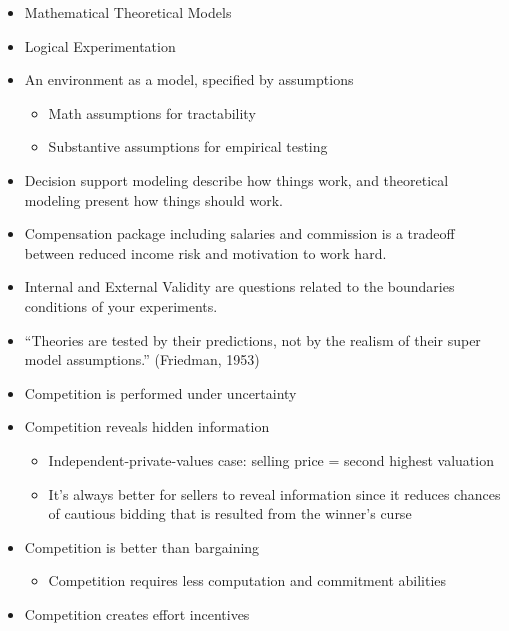 \documentclass[
]{book}
\providecommand{\tightlist}{%
  \setlength{\itemsep}{0pt}\setlength{\parskip}{0pt}}
\begin{document}
\citep{moorthy1993}

\begin{itemize}
\item
  Mathematical Theoretical Models
\item
  Logical Experimentation
\item
  An environment as a model, specified by assumptions

  \begin{itemize}
  \item
    Math assumptions for tractability
  \item
    Substantive assumptions for empirical testing
  \end{itemize}
\item
  Decision support modeling describe how things work, and theoretical modeling present how things should work.
\item
  Compensation package including salaries and commission is a tradeoff between reduced income risk and motivation to work hard.
\item
  Internal and External Validity are questions related to the boundaries conditions of your experiments.
\item
  ``Theories are tested by their predictions, not by the realism of their super model assumptions.'' (Friedman, 1953)
\end{itemize}

\citep{mcafee1996}

\begin{itemize}
\item
  Competition is performed under uncertainty
\item
  Competition reveals hidden information

  \begin{itemize}
  \item
    Independent-private-values case: selling price = second highest valuation
  \item
    It's always better for sellers to reveal information since it reduces chances of cautious bidding that is resulted from the winner's curse
  \end{itemize}
\item
  Competition is better than bargaining

  \begin{itemize}
  \tightlist
  \item
    Competition requires less computation and commitment abilities
  \end{itemize}
\item
  Competition creates effort incentives
\end{itemize}
\end{document}
